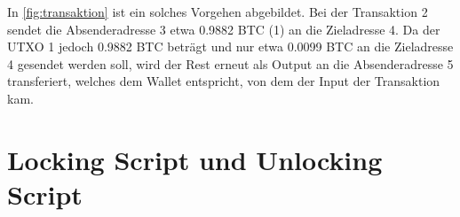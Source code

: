 In \vref{fig:transaktion} ist ein solches Vorgehen abgebildet. Bei der Transaktion 2 sendet die Absenderadresse 3 etwa 0.9882 BTC (1) an die Zieladresse 4. Da der UTXO 1 jedoch 0.9882 BTC beträgt und nur etwa 0.0099 BTC an die Zieladresse 4 gesendet werden soll, wird der Rest erneut als Output an die Absenderadresse 5 transferiert, welches dem Wallet entspricht, von dem der Input der Transaktion kam.


\section{Locking Script und Unlocking Script}\label{sec:locking-unlocking}
